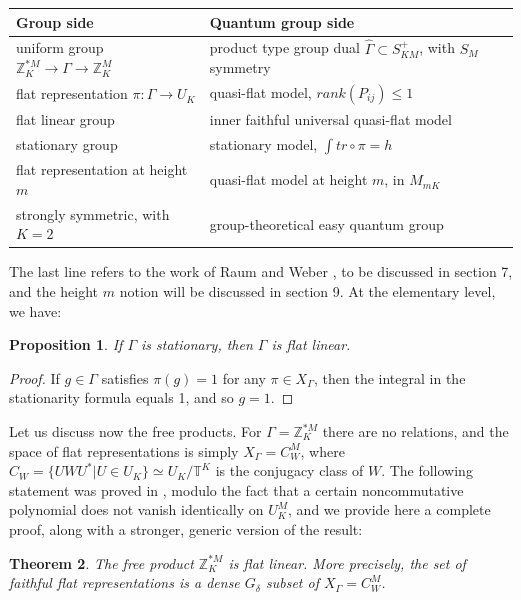 \documentclass[12pt]{amsart}
\newtheorem{theorem}{Theorem}[section]
\newtheorem{proposition}[theorem]{Proposition}
\theoremstyle{definition}
\begin{document}
\begin{center}
\small
\renewcommand{\arraystretch}{1.3}
\begin{tabular}{|l|l|}
\hline
Group side&Quantum group side\\
\hline
uniform group $\mathbb Z_K^{*M}\to\Gamma\to\mathbb Z_K^M$&product type group dual $\widehat{\Gamma}\subset S_{KM}^+$, with $S_M$ symmetry\\
flat representation $\pi:\Gamma\to U_K$&quasi-flat model, $rank(P_{ij})\leq1$\\
flat linear group&inner faithful universal quasi-flat model\\
stationary group&stationary model, $\int tr\circ\pi=h$\\
flat representation at height $m$&quasi-flat model at height $m$, in $M_{mK}$\\
strongly symmetric, with $K=2$&group-theoretical easy quantum group\\
\hline
\end{tabular}
\end{center}

\vspace{4mm}

The last line refers to the work of Raum and Weber \cite{rw2,rwe}, to be discussed in section 7, and the height $m$ notion will be discussed in section 9. At the elementary level, we have:

\begin{proposition}
If $\Gamma$ is stationary, then $\Gamma$ is flat linear.
\end{proposition}

\begin{proof}
If $g\in\Gamma$ satisfies $\pi(g)=1$ for any $\pi\in X_\Gamma$, then the integral in the stationarity formula equals 1, and so $g=1$.
\end{proof}

Let us discuss now the free products. For $\Gamma=\mathbb Z_K^{*M}$ there are no relations, and the space of flat representations is simply $X_\Gamma=C_W^M$, where $C_W=\{UWU^*|U\in U_K\}\simeq U_K/\mathbb T^K$ is the conjugacy class of $W$. The following statement was proved in \cite{bfr}, modulo the fact that a certain noncommutative polynomial does not vanish identically on $U_K^M$, and we provide here a complete proof, along with a stronger, generic version of the result:

\begin{theorem}
The free product $\mathbb Z_K^{*M}$ is flat linear. More precisely, the set of faithful flat representations is a dense $G_\delta$ subset of $X_\Gamma=C_W^M$.
\end{theorem}
\end{document}
